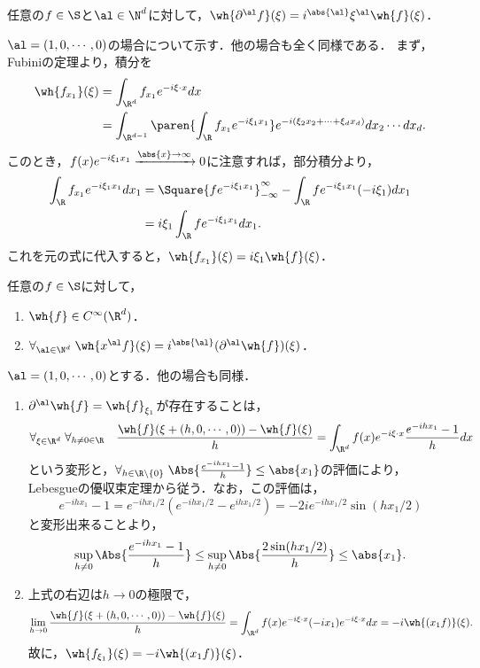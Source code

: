 \documentclass[uplatex,dvipdfmx]{jsreport}
\begin{document}
\begin{proposition}
    任意の$f\in\S$と$\al\in\N^d$に対して，$\wh{\partial^\al f}(\xi)=i^{\abs{\al}}\xi^\al\wh{f}(\xi)$．
\end{proposition}
\begin{Proof}
    $\al=(1,0,\cdots,0)$の場合について示す．他の場合も全く同様である．
    まず，Fubiniの定理より，積分を
    \begin{align*}
        \wh{f_{x_1}}(\xi)&=\int_{\R^d}f_{x_1}e^{-i\xi\cdot x}dx\\
        &=\int_{\R^{d-1}}\paren{\int_\R f_{x_1}e^{-i\xi_1x_1}}e^{-i(\xi_2x_2+\cdots+\xi_dx_d)}dx_2\cdots dx_d.
    \end{align*}
    このとき，$f(x)e^{-i\xi_1x_1}\xrightarrow{\abs{x}\to\infty}0$に注意すれば，部分積分より，
    \begin{align*}
        \int_\R f_{x_1}e^{-i\xi_1x_1}dx_1&=\Square{fe^{-i\xi_1x_1}}^\infty_{-\infty}-\int_\R fe^{-i\xi_1x_1}(-i\xi_1)dx_1\\
        &=i\xi_1\int_\R fe^{-i\xi_1x_1}dx_1.
    \end{align*}
    これを元の式に代入すると，$\wh{f_{x_1}}(\xi)=i\xi_1\wh{f}(\xi)$．
\end{Proof}

\begin{proposition}[$x^\al$を乗じると導関数が出てくる]
    任意の$f\in\S$に対して，
    \begin{enumerate}
        \item $\wh{f}\in C^\infty(\R^d)$．
        \item $\forall_{\al\in\N^d}\;\wh{x^\al f}(\xi)=i^{\abs{\al}}(\partial^\al\wh{f})(\xi)$．
    \end{enumerate}
\end{proposition}
\begin{Proof}
    $\al=(1,0,\cdots,0)$とする．他の場合も同様．
    \begin{enumerate}
        \item $\partial^\al\wh{f}=\wh{f}_{\xi_1}$が存在することは，
        \[\forall_{\xi\in\R^d}\;\forall_{h\ne0\in\R}\quad\frac{\wh{f}(\xi+(h,0,\cdots,0))-\wh{f}(\xi)}{h}=\int_{\R^d}f(x)e^{-i\xi\cdot x}\frac{e^{-ihx_1}-1}{h}dx\]
        という変形と，$\forall_{h\in\R\setminus\{0\}}\;\Abs{\frac{e^{-ihx_1}-1}{h}}\le\abs{x_1}$の評価により，Lebesgueの優収束定理から従う．なお，この評価は，
        \[e^{-ihx_1}-1=e^{-ihx_1/2}(e^{-ihx_1/2}-e^{ihx_1/2})=-2ie^{-ihx_1/2}\sin(hx_1/2)\]
        と変形出来ることより，
        \[\sup_{h\ne0}\Abs{\frac{e^{-ihx_1}-1}{h}}\le\sup_{h\ne0}\Abs{\frac{2\sin(hx_1/2)}{h}}\le\abs{x_1}.\]
        \item 上式の右辺は$h\to0$の極限で，
        \[\lim_{h\to0}\frac{\wh{f}(\xi+(h,0,\cdots,0))-\wh{f}(\xi)}{h}=\int_{\R^d}f(x)e^{-i\xi\cdot x}(-ix_1)e^{-i\xi\cdot x}dx=-i\wh{(x_1f)}(\xi).\]
        故に，$\wh{f_{\xi_1}}(\xi)=-i\wh{(x_1f)}(\xi)$．
    \end{enumerate}
\end{Proof}
\end{document}
